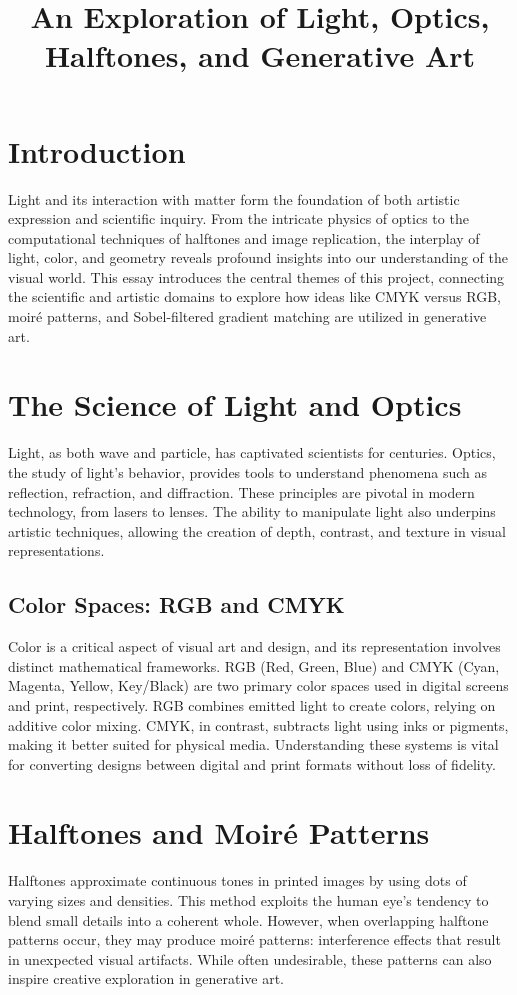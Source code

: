 \documentclass[12pt]{article}
\title{An Exploration of Light, Optics, Halftones, and Generative Art}
\author{}
\date{}
\begin{document}
\maketitle

\section*{Introduction}
Light and its interaction with matter form the foundation of both artistic expression and scientific inquiry. From the intricate physics of optics to the computational techniques of halftones and image replication, the interplay of light, color, and geometry reveals profound insights into our understanding of the visual world. This essay introduces the central themes of this project, connecting the scientific and artistic domains to explore how ideas like CMYK versus RGB, moir\'{e} patterns, and Sobel-filtered gradient matching are utilized in generative art.

\section*{The Science of Light and Optics}
Light, as both wave and particle, has captivated scientists for centuries. Optics, the study of light's behavior, provides tools to understand phenomena such as reflection, refraction, and diffraction. These principles are pivotal in modern technology, from lasers to lenses. The ability to manipulate light also underpins artistic techniques, allowing the creation of depth, contrast, and texture in visual representations.

\subsection*{Color Spaces: RGB and CMYK}
Color is a critical aspect of visual art and design, and its representation involves distinct mathematical frameworks. RGB (Red, Green, Blue) and CMYK (Cyan, Magenta, Yellow, Key/Black) are two primary color spaces used in digital screens and print, respectively. RGB combines emitted light to create colors, relying on additive color mixing. CMYK, in contrast, subtracts light using inks or pigments, making it better suited for physical media. Understanding these systems is vital for converting designs between digital and print formats without loss of fidelity.

\section*{Halftones and Moir\'{e} Patterns}
Halftones approximate continuous tones in printed images by using dots of varying sizes and densities. This method exploits the human eye's tendency to blend small details into a coherent whole. However, when overlapping halftone patterns occur, they may produce moir\'{e} patterns: interference effects that result in unexpected visual artifacts. While often undesirable, these patterns can also inspire creative exploration in generative art.
\end{document}
